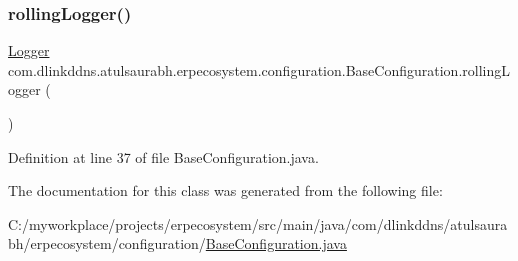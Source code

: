 \subsubsection{\texorpdfstring{rolling\+Logger()}{rollingLogger()}}
{\footnotesize\ttfamily \mbox{\hyperlink{interfacecom_1_1dlinkddns_1_1atulsaurabh_1_1erpecosystem_1_1logger_1_1_logger}{Logger}} com.\+dlinkddns.\+atulsaurabh.\+erpecosystem.\+configuration.\+Base\+Configuration.\+rolling\+Logger (\begin{DoxyParamCaption}{ }\end{DoxyParamCaption})}



Definition at line 37 of file Base\+Configuration.\+java.



The documentation for this class was generated from the following file\+:\begin{DoxyCompactItemize}
\item 
C\+:/myworkplace/projects/erpecosystem/src/main/java/com/dlinkddns/atulsaurabh/erpecosystem/configuration/\mbox{\hyperlink{_base_configuration_8java}{Base\+Configuration.\+java}}\end{DoxyCompactItemize}
